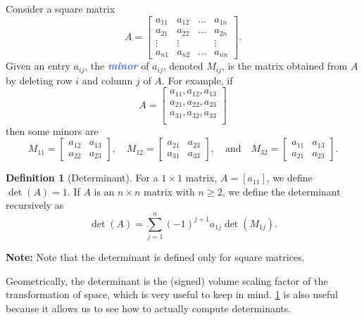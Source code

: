 \documentclass[10pt]{article}
\newcommand{\demph}[1]{\textcolor{RoyalBlue}{\textbf{\slshape #1}}} %
\theoremstyle{definition}
\newtheorem{definition}[theorem]{Definition}
\newcommand{\Fl}[1]{\vspace{5mm}\noindent\textbf{#1}}%
\begin{document}
Consider a square matrix
\begin{equation*}
  A =
  \begin{bmatrix}
    a_{11}&a_{12}&\ldots& a_{1n}\\
    a_{21}&a_{22}&\ldots& a_{2n}\\
    \vdots&\vdots & &\vdots \\
    a_{n1}&a_{n2}&\ldots& a_{nn}
  \end{bmatrix}.
\end{equation*}
Given an entry $a_{ij}$, the \demph{minor} of $a_{ij}$, denoted $M_{ij}$, is the matrix
obtained from $A$ by deleting row $i$ and column $j$ of $A$. For example, if
\begin{equation*}
  A =
  \begin{bmatrix}
    a_{11},a_{12},a_{13}\\
    a_{21},a_{22},a_{23}\\
    a_{31},a_{32},a_{33}\\
  \end{bmatrix}
\end{equation*}
then some minors are
\begin{equation*}
  M_{11} =
  \begin{bmatrix}
    a_{12}&a_{13}\\
    a_{22}&a_{23}
  \end{bmatrix},
  \quad
  M_{12} =
  \begin{bmatrix}
    a_{21}&a_{23}\\
    a_{31}&a_{33}
  \end{bmatrix},
  \quad \text{and} \quad
  M_{32} =
  \begin{bmatrix}
    a_{11}&a_{13}\\
    a_{21}&a_{23}
  \end{bmatrix}.
\end{equation*}

\begin{definition}[Determinant]
  \label{def:determinant}
  For a $1\times 1$ matrix, $A=[a_{11}]$, we define $\det(A) =1$. If $A$ is an
  $n\times n$ matrix with $n \geq 2$, we define the determinant recursively as
  \begin{equation}\label{eq:determinant-definition}
    \det(A) = \sum_{j=1}^{n}(-1)^{j+1}a_{1j}\det(M_{1j}).
  \end{equation}
\end{definition}
\Fl{Note:} Note that the determinant is defined only for square matrices.

Geometrically, the determinant is the (signed) volume scaling factor of the
transformation of space, which is very useful to keep in mind.
\cref{def:determinant} is also useful because it allows us to see how to
actually compute determinants.
\end{document}
